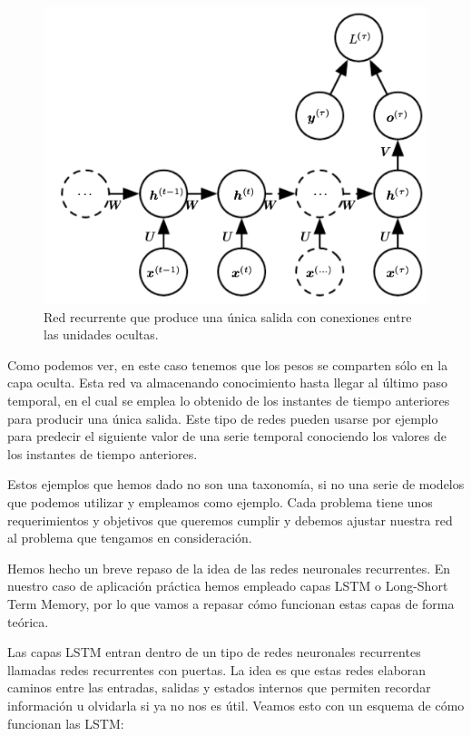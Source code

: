 \begin{figure}[H]
	\centering
	\includegraphics[scale=0.5]{imagenes/rnn3.png}
	\caption{Red recurrente que produce una única salida con conexiones entre las unidades ocultas.}
	\label{img:red-recurrente3}
\end{figure}

Como podemos ver, en este caso tenemos que los pesos se comparten sólo en la capa oculta. Esta red va almacenando conocimiento hasta llegar al último paso temporal, en el cual se emplea lo obtenido de los instantes de tiempo anteriores para producir una única salida. Este tipo de redes pueden usarse por ejemplo para predecir el siguiente valor de una serie temporal conociendo los valores de los instantes de tiempo anteriores.

Estos ejemplos que hemos dado no son una taxonomía, si no una serie de modelos que podemos utilizar y empleamos como ejemplo. Cada problema tiene unos requerimientos y objetivos que queremos cumplir y debemos ajustar nuestra red al problema que tengamos en consideración.

Hemos hecho un breve repaso de la idea de las redes neuronales recurrentes. En nuestro caso de aplicación práctica hemos empleado capas LSTM o Long-Short Term Memory, por lo que vamos a repasar cómo funcionan estas capas de forma teórica.

Las capas LSTM entran dentro de un tipo de redes neuronales recurrentes llamadas redes recurrentes con puertas. La idea es que estas redes elaboran caminos entre las entradas, salidas y estados internos que permiten recordar información u olvidarla si ya no nos es útil. Veamos esto con un esquema de cómo funcionan las LSTM:

